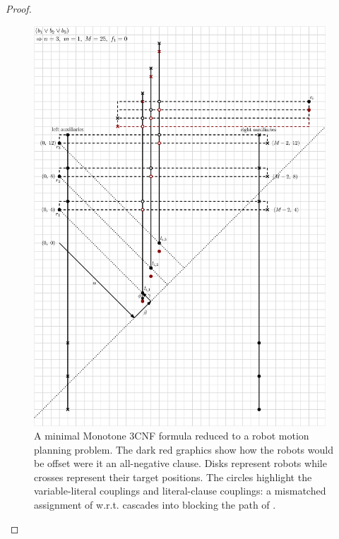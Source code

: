 \begin{proof}
\begin{figure}[h]
	\centering
	\includegraphics[height=15cm]{ipe/np_reduction.eps}
	\caption{
		A minimal Monotone 3CNF formula  reduced to a robot motion planning problem. The dark red graphics show how the robots would be offset were it an all-negative clause. Disks represent robots while crosses represent their target positions. The circles highlight the variable-literal couplings and literal-clause couplings: a mismatched assignment of  w.r.t.  cascades into  blocking the path of .
	}\label{fig:full_reduction}
\end{figure}







\end{proof}
